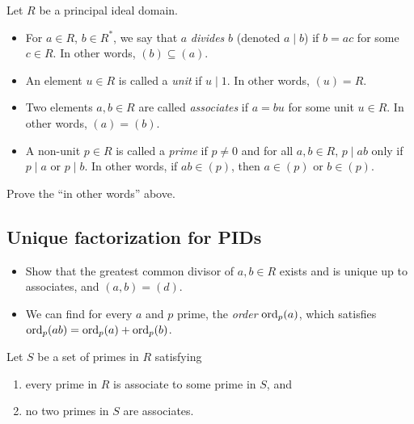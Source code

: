 \begin{definition}
    Let $R$ be a principal ideal domain.
    \begin{itemize}
        \item For $a \in R$, $b \in R^*$, we say that $a$ \emph{divides} $b$
        (denoted $a \mid b$) if $b = ac$ for some $c \in R$.
        In other words, $(b) \subseteq (a)$.
        \item An element $u \in R$ is called a \emph{unit} if $u \mid 1$.
        In other words, $(u) = R$.
        \item Two elements $a, b \in R$ are called \emph{associates}
        if $a = bu$ for some unit $u \in R$.
        In other words, $(a) = (b)$.
        \item A non-unit $p \in R$ is called a \emph{prime} if $p \ne 0$ and
        for all $a, b \in R$, $p \mid ab$ only if $p \mid a$ or $p \mid b$.
        In other words, if $ab \in (p)$, then $a \in (p)$ or $b \in (p)$.
    \end{itemize}
\end{definition}
\begin{exercise}
    Prove the ``in other words'' above.
\end{exercise}

\subsection{Unique factorization for PIDs}
\label{sec:pid:unique_factorization}
\begin{itemize}
    \item Show that the greatest common divisor of $a, b \in R$ exists
    and is unique up to associates, and $(a, b) = (d)$.
    \item We can find for every $a$ and $p$ prime, the \emph{order}
    $\operatorname{ord}_p(a)$, which satisfies $\operatorname{ord}_p(ab) = \operatorname{ord}_p(a) + \operatorname{ord}_p(b)$.
\end{itemize}
Let $S$ be a set of primes in $R$ satisfying
\begin{enumerate}
    \item every prime in $R$ is associate to some prime in $S$, and
    \item no two primes in $S$ are associates.
\end{enumerate}

